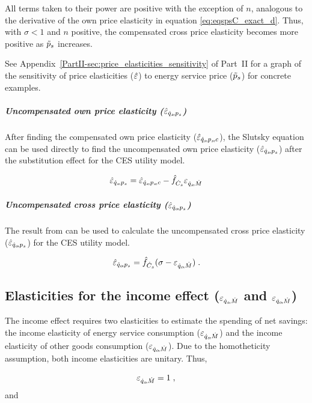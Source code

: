 \documentclass[12pt]{article}\usepackage[]{graphicx}\usepackage[]{xcolor}
\begin{document}
All terms taken to their power are positive with the exception of $n$,
analogous to the derivative of the own price elasticity in equation \ref{eq:eqspsC_exact_d}. 
Thus, with $\sigma<1$ and $n$ positive, the compensated cross price
elasticity becomes more positive as $\tilde{p}_s$ increases.

See Appendix~\ref{PartII-sec:price_elasticities_sensitivity} of Part~II 
for a graph of the sensitivity of price elasticities ($\hat{\varepsilon}$)
to energy service price ($\tilde{p}_s$) for concrete examples.


\subparagraph{Uncompensated own price elasticity ($\hat{\varepsilon}_{\dot{q}_s\!,p_s}$)} 

After finding the compensated own price elasticity ($\hat{\varepsilon}_{\dot{q}_s\!,p_s\!,c}$),
the Slutsky equation can be used directly to find the 
uncompensated own price elasticity ($\hat{\varepsilon}_{\dot{q}_s\!,p_s}$)
after the substitution effect for the CES utility model.

\begin{equation}
  \hat{\varepsilon}_{\dot{q}_s\!,p_s} = \hat{\varepsilon}_{\dot{q}_s\!,p_s\!,c} - \hat{f}_{\dot{C}_s} \varepsilon_{\dot{q}_s\!,\dot{M}}
\end{equation}


\subparagraph{Uncompensated cross price elasticity ($\hat{\varepsilon}_{\dot{q}_o\!,p_s}$)} 

The result from \citet{Hicks1934} can be used to 
calculate the uncompensated cross price elasticity ($\hat{\varepsilon}_{\dot{q}_o\!,p_s}$)
for the CES utility model.

\begin{equation}
  \hat{\varepsilon}_{\dot{q}_o\!,p_s} = \hat{f}_{\dot{C}_s} (\sigma - \varepsilon_{\dot{q}_o\!,\dot{M}}) \; .
\end{equation}


\subsection{Elasticities for the income effect ($\varepsilon_{\dot{q}_s\!,\dot{M}}$ and $\varepsilon_{\dot{q}_o\!,\dot{M}}$)}
\label{sec:income_elasticities}

The income effect requires two elasticities to 
estimate the spending of net savings:
the income elasticity of energy service consumption ($\varepsilon_{\dot{q}_s\!,\dot{M}}$) and
the income elasticity of other goods consumption ($\varepsilon_{\dot{q}_o\!,\dot{M}}$).
Due to the homotheticity assumption,
both income elasticities are unitary. 
Thus, 

\begin{equation} \label{eq:eqsM}
  \varepsilon_{\dot{q}_s\!,\dot{M}} = 1 \; ,
\end{equation}
%
and
\end{document}
